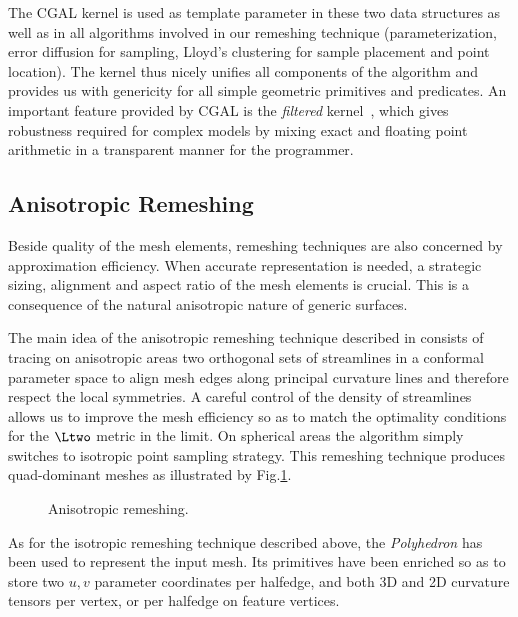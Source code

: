 The CGAL kernel is used as template parameter in these two data
structures as well as in all algorithms involved in our remeshing
technique (parameterization, error diffusion for sampling, Lloyd's
clustering for sample placement and point location). The kernel thus
nicely unifies all components of the algorithm and provides us with
genericity for all simple geometric primitives and predicates. An
important feature provided by CGAL is the \emph{filtered}
kernel~\cite{bbp-iayed-01,p-iaeia-99}, which gives robustness required
for complex models by mixing exact and floating point arithmetic in a
transparent manner for the programmer.

\subsection{Anisotropic Remeshing}


Beside quality of the mesh elements, remeshing techniques are also
concerned by approximation efficiency. When accurate representation is
needed, a strategic sizing, alignment and aspect ratio of the mesh
elements is crucial. This is a consequence of the natural anisotropic
nature of generic surfaces.


The main idea of the anisotropic remeshing technique described in
\cite{acdld-apr-03} consists of tracing on anisotropic areas two 
orthogonal sets of streamlines in a conformal parameter space to align
mesh edges along principal curvature lines and therefore respect the
local symmetries. A careful control of the density of streamlines
allows us to improve the mesh efficiency so as to match the optimality
conditions for the $\Ltwo$ metric in the limit. On spherical areas the
algorithm simply switches to isotropic point sampling strategy. This
remeshing technique produces quad-dominant meshes as illustrated by
Fig.\ref{fig:anisotropic}.

\begin{figure}
  \centering
  \caption{Anisotropic remeshing.}
  \label{fig:anisotropic}
\end{figure}

As for the isotropic remeshing technique described above, the
\emph{Polyhedron} has been used to represent the input mesh. Its
primitives have been enriched so as to store two $u,v$ parameter
coordinates per halfedge, and both 3D and 2D curvature tensors per
vertex, or per halfedge on feature vertices.

